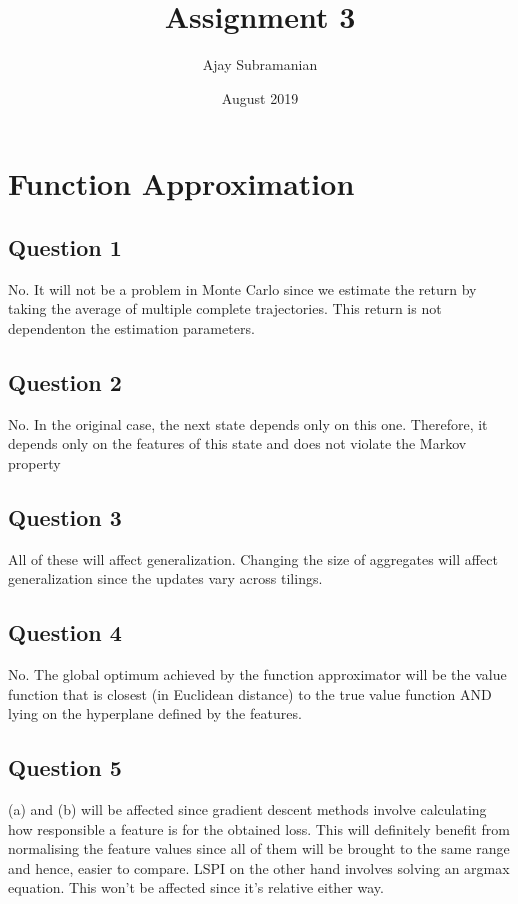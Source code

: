 \documentclass[12pt]{extarticle}
\title{Assignment 3}
\author{Ajay Subramanian}
\date{August 2019}
\begin{document}
\maketitle
\setcounter{secnumdepth}{0}

\section{Function Approximation}
\subsection{Question 1}
No. It will not be a problem in Monte Carlo since we estimate the return by taking the average of multiple complete trajectories. This return is not dependenton the estimation parameters.

\subsection{Question 2}
No. In the original case, the next state depends only on this one. Therefore, it depends only on the features of this state and does not violate the Markov property

\subsection{Question 3}
All of these will affect generalization. Changing the size of aggregates will affect generalization since the updates vary across tilings.

\subsection{Question 4}
No. The global optimum achieved by the function approximator will be the value function that is closest (in Euclidean distance) to the true value function AND lying on the hyperplane defined by the features.

\subsection{Question 5}
(a) and (b) will be affected since gradient descent methods involve calculating how responsible a feature is for the obtained loss. This will definitely benefit from normalising the feature values since all of them will be brought to the same range and hence, easier to compare. LSPI on the other hand involves solving an argmax equation. This won't be affected since it's relative either way.
\end{document}
